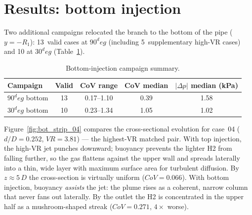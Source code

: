 \documentclass[10pt,a4paper]{article}
\def\Hi{H2}%
\def\dD{d/D}%
\def\VR{VR}%
\def\CoV{CoV}%
\def\circ{ deg}%
\newcommand{\Hi}{\ensuremath{\mathrm{H_2}}}
\newcommand{\dD}{\ensuremath{d/D}}
\newcommand{\VR}{\ensuremath{\mathrm{VR}}}
\newcommand{\CoV}{\ensuremath{\mathrm{CoV}}}
\begin{document}
\section{Results: bottom injection}
\label{sec:bottom}

Two additional campaigns relocated the branch to the bottom of the
pipe (\(y=-R_1\)): 13~valid cases at \(90^\circ\) (including
5~supplementary high-\VR{} cases) and 10 at \(30^\circ\)
(Table~\ref{tab:bot_summary}).

\begin{table}[H]
\centering\scriptsize
\caption{Bottom-injection campaign summary.}
\label{tab:bot_summary}
\begin{tabular}{l c c c c}
\toprule
Campaign & Valid & \CoV{} range & \CoV{} median
& \(|\Delta p|\) median (kPa) \\
\midrule
\(90^\circ\) bottom & 13 & 0.17--1.10 & 0.39 & 1.58 \\
\(30^\circ\) bottom & 10 & 0.23--1.34 & 1.05 & 1.02 \\
\bottomrule
\end{tabular}
\end{table}

Figure~\ref{fig:bot_strip_04} compares the cross-sectional
evolution for case~04 (\(\dD=0.252\), \(\VR=3.81\)) --- the
highest-\VR{} matched pair.
With top injection, the high-\VR{} jet punches downward; buoyancy
prevents the lighter \Hi{} from falling further, so the gas
flattens against the upper wall and spreads laterally into a thin,
wide layer with maximum surface area for turbulent diffusion.
By \(z\approx 5\,D\) the cross-section is virtually uniform
(\(\CoV=0.066\)).
With bottom injection, buoyancy \emph{assists} the jet: the plume
rises as a coherent, narrow column that never fans out laterally.
By the outlet the \Hi{} is concentrated in the upper half as a
mushroom-shaped streak (\(\CoV=0.271\), \(4\times\) worse).
\end{document}
